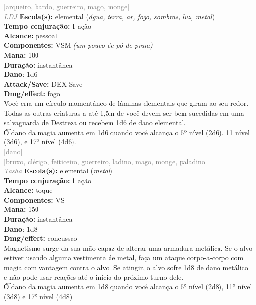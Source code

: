 \documentclass{RPG_Adventure}[2021/10/20]
\begin{document}
{\scriptsize \textcolor{gray}{[arqueiro, bardo, guerreiro, mago, monge]\\}}
{\tiny \textcolor{gray}{\textit{LDJ}}}\jump{}
{\small \t \textbf{Escola(s):} elemental (\textit{água, terra, ar, fogo, sombras, luz, metal})\\\t \textbf{Tempo conjuração:} 1 ação\\\t \textbf{Alcance:} pessoal\\\t \textbf{Componentes:} VSM \textit{(um pouco de pó de prata)}\\\t \textbf{Mana:} 100\\\t \textbf{Duração:} instantânea\\\t \textbf{Dano}: 1d6\\\t \textbf{Attack/Save:} DEX Save\\\t \textbf{Dmg/effect:} fogo\\}
{\normalsize Você cria um círculo momentâneo de lâminas elementais que giram ao seu redor. Todas as outras criaturas a até 1,5m de você devem ser bem-sucedidas em uma salvaguarda de Destreza ou recebem 1d6 de dano elemental.\\\t O dano da magia aumenta em 1d6 quando você alcança o 5º nível (2d6), 11 nível (3d6), e 17º nível (4d6).\\}
{\scriptsize \textcolor{gray}{[dano]\\}}
{\scriptsize \textcolor{gray}{[bruxo, clérigo, feiticeiro, guerreiro, ladino, mago, monge, paladino]\\}}
{\tiny \textcolor{gray}{\textit{Tasha}}}\jump{}
{\small \t \textbf{Escola(s):} elemental (\textit{metal})\\\t \textbf{Tempo conjuração:} 1 ação\\\t \textbf{Alcance:} toque\\\t \textbf{Componentes:} VS\\\t \textbf{Mana:} 150\\\t \textbf{Duração:} instantânea\\\t \textbf{Dano}: 1d8\\\t \textbf{Dmg/effect:} concussão\\}
{\normalsize Magnetismo surge da sua mão capaz de alterar uma armadura metálica. Se o alvo estiver usando alguma vestimenta de metal, faça um ataque corpo-a-corpo com magia com vantagem contra o alvo. Se atingir, o alvo sofre 1d8 de dano metálico e não pode usar reações até o início do próximo turno dele.\\\t O dano da magia aumenta em 1d8 quando você alcança o 5° nível (2d8), 11° nível (3d8) e 17° nível (4d8).\\}
\end{document}

